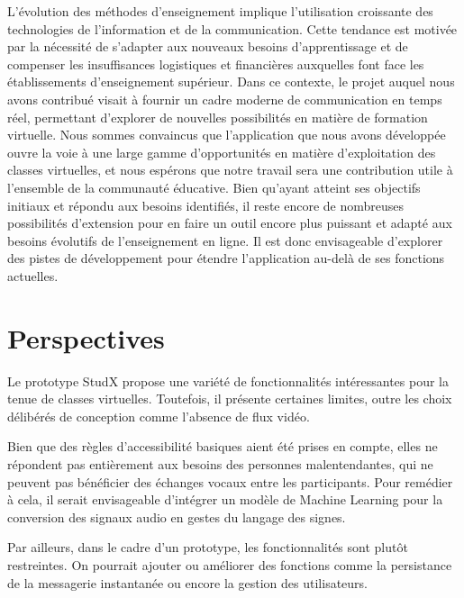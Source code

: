 \conclusion
L'évolution des méthodes d'enseignement implique l'utilisation croissante des technologies de l'information et de la communication. 
Cette tendance est motivée par la nécessité de s'adapter aux nouveaux besoins d'apprentissage et de compenser les insuffisances logistiques et 
financières auxquelles font face les établissements d'enseignement supérieur. Dans ce contexte, 
le projet auquel nous avons contribué visait à fournir un cadre moderne de communication en temps réel, 
permettant d'explorer de nouvelles possibilités en matière de formation virtuelle. 
Nous sommes convaincus que l'application que nous avons développée ouvre la voie à une large gamme d'opportunités en matière d'exploitation des classes virtuelles, 
et nous espérons que notre travail sera une contribution utile à l'ensemble de la communauté éducative.  
Bien qu'ayant atteint ses objectifs initiaux et répondu aux besoins identifiés, il reste encore de nombreuses possibilités d'extension pour en faire un outil encore plus puissant et adapté aux besoins évolutifs de l'enseignement en ligne. 
Il est donc envisageable d'explorer des pistes de développement pour étendre l'application au-delà de ses fonctions actuelles.

\section*{Perspectives}
Le prototype StudX propose une variété de fonctionnalités intéressantes pour la tenue de classes virtuelles.  
Toutefois, il présente certaines limites, outre les choix délibérés de conception comme l’absence de flux vidéo. 

Bien que des règles d'accessibilité basiques aient été prises en compte, elles ne répondent pas entièrement aux 
besoins des personnes malentendantes, qui ne peuvent pas bénéficier des échanges vocaux entre les participants. 
Pour remédier à cela, il serait envisageable d'intégrer un modèle de Machine Learning pour la conversion des signaux 
audio en gestes du langage des signes.

Par ailleurs, dans le cadre d’un prototype, les fonctionnalités sont plutôt restreintes. 
On pourrait ajouter ou améliorer des fonctions comme la persistance de la messagerie instantanée ou 
encore la gestion des utilisateurs.

